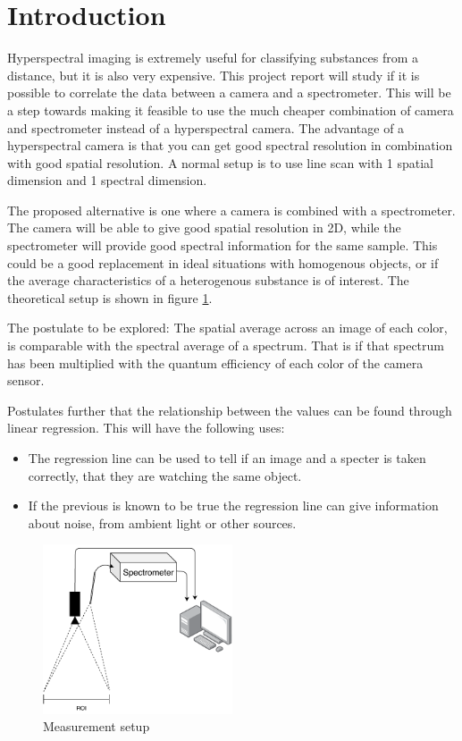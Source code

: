 \section{Introduction}
\label{sec:introduction}
Hyperspectral imaging is extremely useful for classifying substances from a distance, but it is also very expensive. This project report will study if it is possible to correlate the data between a camera and a spectrometer. This will be a step towards making it feasible to use the much cheaper combination of camera and spectrometer instead of a hyperspectral camera. The advantage of a hyperspectral camera is that you can get good spectral resolution in combination with good spatial resolution. A normal setup is to use line scan with 1 spatial dimension and 1 spectral dimension.

The proposed alternative is one where a camera is combined with a spectrometer. The camera will be able to give good spatial resolution in 2D, while the spectrometer will provide good spectral information for the same sample. This could be a good replacement in ideal situations with homogenous objects, or if the average characteristics of a heterogenous substance is of interest. The theoretical setup is shown in figure \ref{fig:measurement_setup}. 

The postulate to be explored: 
The spatial average across an image of each color, is comparable with the spectral average of a spectrum. That is if that spectrum has been multiplied with the quantum efficiency of each color of the camera sensor. 

Postulates further that the relationship between the values can be found through linear regression. This will have the following uses: 
\begin{itemize}
    \item The regression line can be used to tell if an image and a specter is taken correctly, that they are watching the same object. 
    \item If the previous is known to be true the regression line can give information about noise, from ambient light or other sources. 
\end{itemize}


\begin{figure}[h]
    \centering
    \includegraphics[width=0.5\textwidth]{figures/pt_setup.pdf}
    \caption{Measurement setup}
    \label{fig:measurement_setup}
\end{figure}

